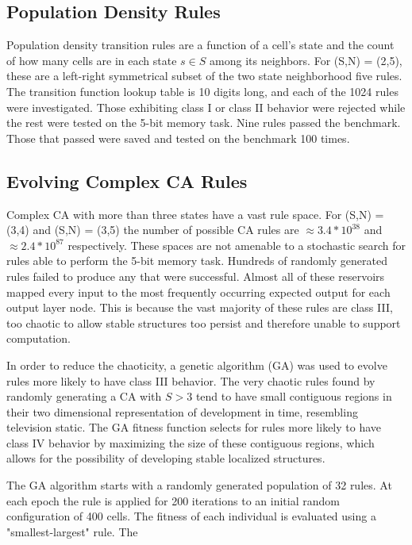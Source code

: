 \documentclass{facconf}
\begin{document}
\begin{multicols}{2}
\subsection{Population Density Rules}
Population density transition rules are a function of a cell's state and the 
count of how many cells are in each state $s \in S$ among its neighbors. For 
(S,N) = (2,5), these are a left-right symmetrical subset of the two state 
neighborhood five rules. The transition function lookup table is 10 digits 
long, and each of the 1024 rules were investigated. Those exhibiting class I or 
class II behavior were rejected while the rest were tested on the 5-bit memory 
task. Nine rules passed the benchmark. Those that passed were saved and tested 
on the benchmark 100 times.

  \subsection{Evolving Complex CA Rules}
Complex CA with more than three states have a vast rule space. For (S,N) = 
(3,4) and (S,N) = (3,5) the number of possible CA rules are $\approx 3.4 * 
10^38$ and $\approx 2.4 * 10^87$ respectively. These spaces are not amenable to 
a stochastic search for rules able to perform the 5-bit memory task.  Hundreds 
of randomly generated rules failed to produce any that were successful. Almost 
all of these reservoirs mapped every input to the most frequently occurring 
expected output for each output layer node. This is because the vast majority 
of these rules are class III, too chaotic to allow stable structures too 
persist and therefore unable to support computation.\par
In order to reduce the chaoticity, a genetic algorithm (GA) was used to evolve 
rules more likely to have class III behavior. The very chaotic rules found by 
randomly generating a CA with $S > 3$ tend to have small contiguous regions in 
their two dimensional representation of development in time, resembling 
television static.  The GA fitness function selects for rules more likely to 
have class IV behavior by maximizing the size of these contiguous regions, 
     which allows for the possibility of developing stable localized 
     structures. \par The GA algorithm starts with a randomly generated 
     population of 32 rules. At each epoch the rule is applied for 200 
     iterations to an initial random configuration of 400 cells.  The fitness 
     of each individual is evaluated using a "smallest-largest" rule.  The 

\end{multicols}
\end{document}
